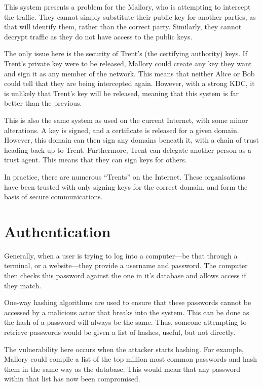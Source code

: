 			This system presents a problem for the Mallory, who is attempting to intercept the traffic. 
			They cannot simply substitute their public key for another parties, as that will identify them, rather than the correct party. 
			Similarly, they cannot decrypt traffic as they do not have access to the public keys. 

			The only issue here is the security of Trent's (the certifying authority) keys.
			If Trent's private key were to be released, Mallory could create any key they want and sign it as any member of the network. 
			This means that neither Alice or Bob could tell that they are being intercepted again. 
			However, with a strong KDC, it is unlikely that Trent's key will be released, meaning that this system is far better than the previous. 

			This is also the same system as used on the current Internet, with some minor alterations. 
			A key is signed, and a certificate is released for a given domain. 
			However, this domain can then sign any domains beneath it, with a chain of trust heading back up to Trent. 
			Furthermore, Trent can delegate another person as a trust agent. 
			This means that they can sign keys for others. 

			In practice, there are numerous ``Trents'' on the Internet. 
			These organisations have been trusted with only signing keys for the correct domain, 
			and form the basis of secure communications. 
	\section{Authentication}
		Generally, when a user is trying to log into a computer---be that through a terminal, or a website---they provide a username and password. 
		The computer then checks this password against the one in it's database and allows access if they match. 

		One-way hashing algorithms are used to ensure that these passwords cannot be accessed by a malicious actor that breaks into the system. 
		This can be done as the hash of a password will always be the same. 
		Thus, someone attempting to retrieve passwords would be given a list of hashes, useful, but not directly. 

		The vulnerability here occurs when the attacker starts hashing. 
		For example, Mallory could compile a list of the top million most common passwords and hash them in the same way as the database. 
		This would mean that any password within that list has now been compromised. 

